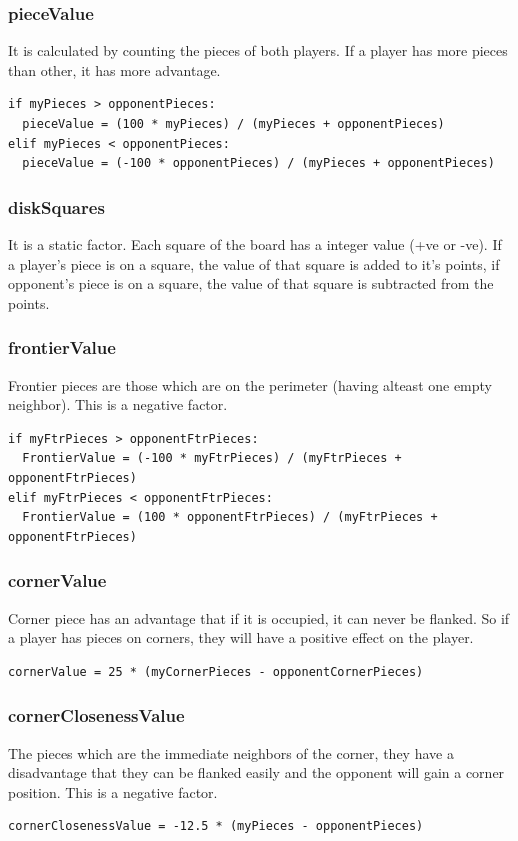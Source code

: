 \documentclass[a4paper,10pt]{article}
\begin{document}
\subsubsection*{pieceValue}
It is calculated by counting the pieces of both players. If a player has more pieces than other, it has more advantage.
\begin{verbatim}
if myPieces > opponentPieces:
  pieceValue = (100 * myPieces) / (myPieces + opponentPieces)
elif myPieces < opponentPieces:
  pieceValue = (-100 * opponentPieces) / (myPieces + opponentPieces)
\end{verbatim}

\subsubsection*{diskSquares}
It is a static factor. Each square of the board has a integer value (+ve or -ve). If a player's piece is on a square, the value of that square is added to it's points, if opponent's piece is on a square, the value of that square is subtracted from the points.

\subsubsection*{frontierValue}
Frontier pieces are those which are on the perimeter (having alteast one empty neighbor). This is a negative factor.
\begin{verbatim}
if myFtrPieces > opponentFtrPieces:
  FrontierValue = (-100 * myFtrPieces) / (myFtrPieces + opponentFtrPieces)
elif myFtrPieces < opponentFtrPieces:
  FrontierValue = (100 * opponentFtrPieces) / (myFtrPieces + opponentFtrPieces)
\end{verbatim}

\subsubsection*{cornerValue}
Corner piece has an advantage that if it is occupied, it can never be flanked. So if a player has pieces on corners, they will have a positive effect on the player.
\begin{verbatim}
cornerValue = 25 * (myCornerPieces - opponentCornerPieces)
\end{verbatim}

\subsubsection*{cornerClosenessValue}
The pieces which are the immediate neighbors of the corner, they have a disadvantage that they can be flanked easily and the opponent will gain a corner position. This is a negative factor.
\begin{verbatim}
cornerClosenessValue = -12.5 * (myPieces - opponentPieces)
\end{verbatim}
\end{document}
